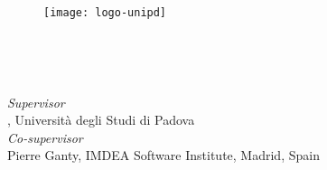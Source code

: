 
\begin{titlepage}

\begin{center}

\begin{LARGE}
\textbf{\myUni}\\
\end{LARGE}

\vspace{10pt}

\begin{Large}
\textsc{\myDepartment}\\
\end{Large}

\vspace{10pt}

\begin{large}
\textsc{\myFaculty}\\
\end{large}

\vspace{25pt}
\begin{figure}[htbp]
\begin{center}
\texttt{[image: logo-unipd]}
\end{center}
\end{figure}
\vspace{25pt}

\begin{LARGE}
\begin{center}
\textbf{\myTitle}\\
\end{center}
\end{LARGE}

\vspace{10pt}

\begin{large}
\textsl{\myDegree}\\
\end{large}

\vspace{25pt}

\begin{large}
\begin{flushleft}
\textit{Supervisor}\\
\vspace{5pt}
\profTitle{} \myProf{}, Università degli Studi di Padova \\
\vspace{5pt}
\textit{Co-supervisor}\\
\vspace{5pt}
\profTitle{} Pierre Ganty, IMDEA Software Institute, Madrid, Spain\\
\end{flushleft}


\end{large}
\end{center}
\end{titlepage}
